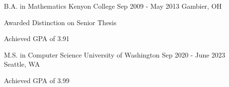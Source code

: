 
\vspace{-3mm}

\begin{minipage}[t]{.49\textwidth}
\begin{cventries}
  \cventry
  {B.A. in Mathematics}
    {Kenyon College}
    {Sep 2009 - May 2013}
    {Gambier, OH}
    {
      \begin{cvitems}
        \item {Awarded Distinction on Senior Thesis}
        \item {Achieved GPA of 3.91}
      \end{cvitems}
    }
\end{cventries}
\end{minipage}
\hspace{.02\textwidth}
\begin{minipage}[t]{.49\textwidth}
\begin{cventries}
  \cventry
  {M.S. in Computer Science}
    {University of Washington}
    {Sep 2020 - June 2023}
    {Seattle, WA}
    {
      \begin{cvitems}
        \item {Achieved GPA of 3.99}
      \end{cvitems}
    }
\end{cventries}

\end{minipage}


